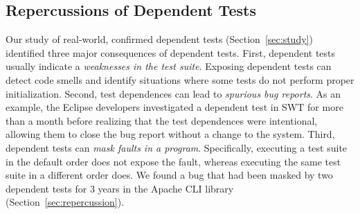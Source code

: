 

\subsection{Repercussions of Dependent Tests}



Our study of \dtnum real-world, confirmed dependent
tests 
(Section~\ref{sec:study}) identified three
major consequences of dependent tests.
%
First, dependent tests usually indicate a
\emph{weaknesses in the test suite}. Exposing
dependent tests can detect code smells and identify situations
where some tests do not perform proper initialization.
%
Second, test dependences can lead
to \emph{spurious bug reports}. As an example, the Eclipse developers
investigated a dependent test in
SWT for
more than a month before realizing that the test dependences were intentional,
allowing them to close the bug report without a change to the system.
%
Third, dependent tests can
\emph{mask faults in a program}. Specifically, executing a test suite in the
default order does not expose the fault, whereas
executing the same test suite in a different order does. We found 
a bug that had been masked by two dependent tests
for 3 years in the Apache CLI library~\cite{cli} (Section~\ref{sec:repercussion}).


